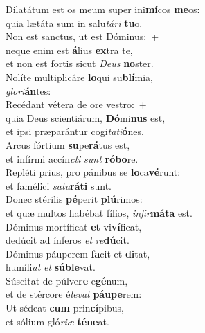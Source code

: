 \evenverse Dilatátum est os meum super ini\textbf{mí}cos \textbf{me}os:~\*\\
\evenverse quia lætáta sum in salu\textit{tá}\textit{ri} \textbf{tu}o.\\
\oddverse Non est sanctus, ut est Dóminus:~+\\
\oddverse  neque enim est \textbf{á}lius \textbf{ex}tra te,~\*\\
\oddverse et non est fortis sicut \textit{De}\textit{us} \textbf{no}ster.\\
\evenverse Nolíte multiplicáre \textbf{lo}qui su\textbf{blí}mia,~\*\\
\evenverse \textit{glo}\textit{ri}\textbf{án}tes:\\
\oddverse Recédant vétera de ore vestro:~+\\
\oddverse  quia Deus scientiárum, \textbf{Dó}mi\textbf{nus} est,~\*\\
\oddverse et ipsi præparántur cogi\textit{ta}\textit{ti}\textbf{ó}nes.\\
\evenverse Arcus fórtium \textbf{su}pe\textbf{rá}tus est,~\*\\
\evenverse et infírmi accín\textit{cti} \textit{sunt} \textbf{ró}\textbf{bo}re.\\
\oddverse Repléti prius, pro pánibus se \textbf{lo}ca\textbf{vé}runt:~\*\\
\oddverse et famélici \textit{sa}\textit{tu}\textbf{rá}\textbf{ti} sunt.\\
\evenverse Donec stérilis \textbf{pé}perit \textbf{plú}rimos:~\*\\
\evenverse et quæ multos habébat fílios, \textit{in}\textit{fir}\textbf{má}\textbf{ta} est.\\
\oddverse Dóminus mortíficat \textbf{et} vi\textbf{ví}ficat,~\*\\
\oddverse dedúcit ad ínferos \textit{et} \textit{re}\textbf{dú}cit.\\
\evenverse Dóminus páuperem \textbf{fa}cit et \textbf{di}tat,~\*\\
\evenverse humíli\textit{at} \textit{et} \textbf{sú}\textbf{ble}vat.\\
\oddverse Súscitat de púlve\textbf{re} e\textbf{gé}num,~\*\\
\oddverse et de stércore é\textit{le}\textit{vat} \textbf{páu}\textbf{pe}rem:\\
\evenverse Ut sédeat \textbf{cum} prin\textbf{cí}pibus,~\*\\
\evenverse et sólium gló\textit{ri}\textit{æ} \textbf{té}\textbf{ne}at.\\
